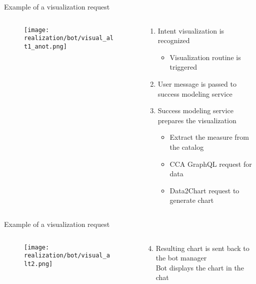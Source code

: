 \begin{frame}{Example of a visualization request}
    
    \begin{columns}
        \begin{column}[t]{0.5\textwidth}
            \begin{figure}
                \texttt{[image: realization/bot/visual\_alt1\_anot.png]} 
            \end{figure}
        \end{column}
        \begin{column}[t]{0.5\textwidth}
            \begin{enumerate}
              \item Intent visualization is recognized
              \begin{itemize}
                \item Visualization routine is triggered
              \end{itemize}
              \item User message is passed to success modeling service
            \item Success modeling service prepares the visualization
            \begin{itemize}
              \item Extract the measure from the catalog
              \item CCA GraphQL request for data
              \item Data2Chart request to generate chart
            \end{itemize}
            \end{enumerate}
        \end{column}
    \end{columns}
\end{frame}

\begin{frame}{Example of a visualization request}
  \begin{columns}
    \begin{column}[t]{0.5\textwidth}
      \begin{figure}
        \texttt{[image: realization/bot/visual\_alt2.png]} 
      \end{figure}
    \end{column}
    \begin{column}[t]{0.5\textwidth}
      \begin{enumerate}
        \setcounter{enumi}{3}
        \item Resulting chart is sent back to the bot manager
        \\Bot displays the chart in the chat
      \end{enumerate}
    \end{column}
  \end{columns}
\end{frame}


